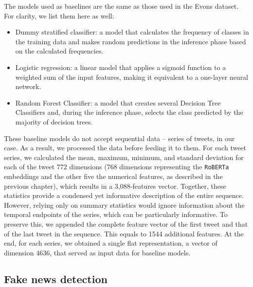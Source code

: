 \documentclass[a4paper,twoside,12pt]{book}
\begin{document}
The models used as baselines are the same as those used in the Evons dataset. For clarity, we list them here as well:

\begin{itemize}
	\item Dummy stratified classifier: a model that calculates the frequency of classes in the training data and makes random predictions in the inference phase based on the calculated frequencies.
	
	\item Logistic regression: a linear model that applies a sigmoid function to a weighted sum of the input features, making it equivalent to a one-layer neural network.
	
	\item Random Forest Classifier: a model that creates several Decision Tree Classifiers and, during the inference phase, selects the class predicted by the majority of decision trees.
\end{itemize}

These baseline models do not accept sequential data -- series of tweets, in our case. As a result, we processed the data before feeding it to them. For each tweet series, we calculated the mean, maximum, minimum, and standard deviation for each of the tweet 772 dimensions (768 dimensions representing the \texttt{RoBERTa} embeddings and the other five the numerical features, as described in the previous chapter), which results in a 3,088-features vector. Together, these statistics provide a condensed yet informative description of the entire sequence. However, relying only on summary statistics would ignore information about the temporal endpoints of the series, which can be particularly informative. To preserve this, we appended the complete feature vector of the first tweet and that of the last tweet in the sequence. This equals to 1544 additional features. At the end, for each series, we obtained a single flat representation, a vector of dimension 4636, that served as input data for baseline models.

\subsection{Fake news detection}
\end{document}
